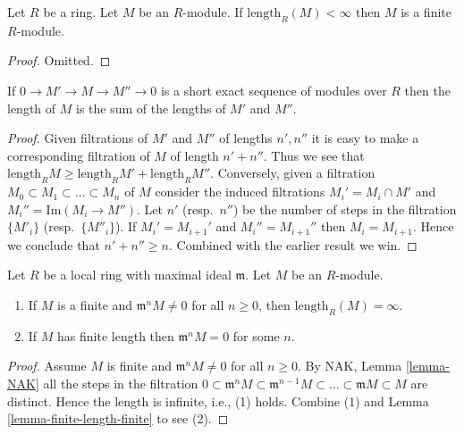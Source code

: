 \begin{lemma}
\label{lemma-finite-length-finite}
Let $R$ be a ring.
Let $M$ be an $R$-module.
If $\text{length}_R(M) < \infty$ then $M$ is a finite $R$-module.
\end{lemma}

\begin{proof}
Omitted.
\end{proof}

\begin{lemma}
\label{lemma-length-additive}
If $0 \to M' \to M \to M'' \to 0$
is a short exact sequence of modules over $R$ then
the length of $M$ is the sum of the
lengths of $M'$ and $M''$.
\end{lemma}

\begin{proof}
Given filtrations of $M'$ and $M''$ of lengths $n', n''$
it is easy to make a corresponding filtration of $M$
of length $n' + n''$. Thus we see that $\text{length}_R M
\geq \text{length}_R M' + \text{length}_R M''$.
Conversely, given a filtration
$M_0 \subset M_1 \subset \ldots \subset M_n$ of
$M$ consider the induced filtrations
$M_i' = M_i \cap M'$ and $M_i'' = \text{Im}(M_i \to M'')$.
Let $n'$ (resp.\ $n''$) be the number of steps in the filtration
$\{M'_i\}$ (resp.\ $\{M''_i\}$).
If $M_i' = M_{i + 1}'$ and $M_i'' = M_{i + 1}''$ then
$M_i = M_{i + 1}$. Hence we conclude that $n' + n'' \geq n$.
Combined with the earlier result we win.
\end{proof}

\begin{lemma}
\label{lemma-length-infinite}
Let $R$ be a local ring with maximal ideal $\mathfrak m$.
Let $M$ be an $R$-module.
\begin{enumerate}
\item If $M$ is a finite and
$\mathfrak m^n M \not = 0$ for all $n\geq 0$,
then $\text{length}_R(M) = \infty$.
\item If $M$ has finite length then $\mathfrak m^nM = 0$
for some $n$.
\end{enumerate}
\end{lemma}

\begin{proof}
Assume $M$ is finite and $\mathfrak m^n M \not = 0$ for all $n\geq 0$.
By NAK, Lemma \ref{lemma-NAK} all the steps in the filtration
$0 \subset \mathfrak m^n M
\subset \mathfrak m^{n-1} M \subset \ldots \subset
\mathfrak m M \subset M$ are distinct. Hence the length is infinite,
i.e., (1) holds.
Combine (1) and Lemma \ref{lemma-finite-length-finite} to see (2).
\end{proof}

